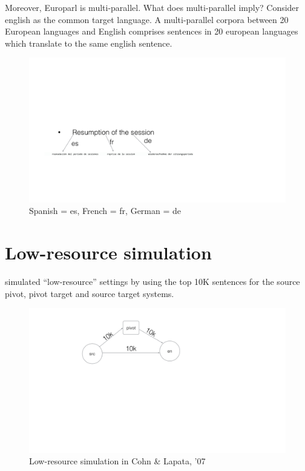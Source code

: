 Moreover, Europarl is multi-parallel. What does multi-parallel imply? Consider english as the common target language. A multi-parallel corpora between 20 European languages and English comprises sentences in 20 european languages which translate to the same english sentence. 

\begin{figure}[ht]
	\includegraphics[trim=4cm 4cm 4cm 4cm, height=0.5\textheight, clip=true]{files/Figures/eparl_multiparallel.jpg}
	\caption{Spanish = es, French = fr, German = de}
	\label{fig:eparl_multi}
	\small
	\centering
\end{figure}



\section{Low-resource simulation}

\cite{Cohn:07} simulated ``low-resource'' settings by using the top 10K sentences for the source pivot, pivot target and source target systems.  

\begin{figure}[ht]
	\small
	\centering
	\includegraphics[trim=2cm 4cm 4cm 4cm, height=0.6\textheight]{files/Figures/Cohn.jpg} 
	\caption{Low-resource simulation in Cohn \& Lapata, '07}
	\label{fig:Cohn_lowresource}
\end{figure}

